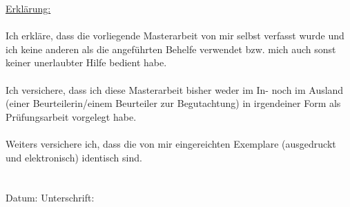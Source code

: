 \hspace*{-0.7cm} \underline{Erklärung:}\\\\
Ich erkläre, dass die vorliegende Masterarbeit von mir selbst verfasst wurde und ich keine anderen als die angeführten Behelfe verwendet bzw. mich auch sonst keiner unerlaubter Hilfe bedient habe.\\\\
Ich versichere, dass ich diese Masterarbeit bisher weder im In- noch im Ausland (einer Beurteilerin/einem Beurteiler zur Begutachtung) in irgendeiner Form als Prüfungsarbeit vorgelegt habe.\\\\
Weiters versichere ich, dass die von mir eingereichten Exemplare (ausgedruckt und elektronisch) identisch sind.
\\\\\\
Datum: \hspace{6cm} Unterschrift: \\


